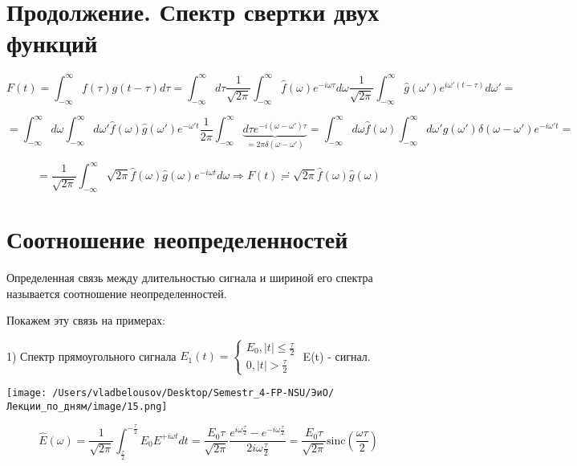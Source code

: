 \documentclass[12pt, a4paper]{report}
\begin{document}
\fi


\section{Продолжение. Спектр свертки двух функций}

\[ F(t)= \int_{-\infty}^{\infty} f(\tau)g(t- \tau)d \tau= \int_{-\infty}^{\infty} d \tau \frac{1}{\sqrt{2 \pi}} \int_{-\infty}^{\infty} \hat{f} (\omega) e ^{- i \omega \tau} d \omega \frac{1}{\sqrt{2\pi}} \int_{-\infty}^{\infty} \hat{g} (\omega') e^{i \omega' (t - \tau)} d \omega'     =\] 

\[ =\int_{-\infty}^{\infty}  d \omega \int_{-\infty}^{\infty} d \omega ' \hat{f} (\omega) \hat{g}(\omega ') e^{- \omega ' t } \frac{1}{2 \pi } \int_{-\infty}^{\infty} \underbrace{d \tau e^{- i (\omega - \omega ' )\tau}}_{=2\pi \delta(\omega- \omega')} = \int_{-\infty}^{\infty}  d \omega \hat{f} ( \omega) \int_{-\infty}^{\infty}  d \omega ' \hat{g} ( \omega ' ) \delta(\omega - \omega ') e ^{-i \omega' t} =        \] 

\[ = \frac{1}{\sqrt{2 \pi}} \int_{-\infty}^{\infty}  \sqrt{ 2 \pi} \hat{f}( \omega ) \hat{g} (\omega   )e ^{- i\omega t}   d \omega \Rightarrow F(t) \risingdotseq \sqrt{ 2 \pi } \hat{f}( \omega ) \hat{g } ( \omega)  \] 

\section{Соотношение неопределенностей}

\begin{definition}
    Определенная связь между длительностью сигнала и шириной его спектра называется соотношение неопределенностей.
\end{definition}

Покажем эту связь на примерах: 

1) Спектр прямоугольного сигнала \( E_1 (t) =\begin{cases}
E_0 , |t| \le  \frac{\tau}{2} \\
0 , |t| > \frac{\tau}{2}
\end{cases} \) E(t) - сигнал.

\begin{center}
    \texttt{[image: /Users/vladbelousov/Desktop/Semestr\_4-FP-NSU/ЭиО/Лекции\_по\_дням/image/15.png]}
\end{center}

\[ \hat{E}(\omega)= \frac{1}{\sqrt{2 \pi}} \int_{\frac{\tau}{2} }^{-\frac{\tau}{2} } E_0 E^{+ i \omega t} d t = \frac{E_0 \tau}{\sqrt{2 \pi}} \frac{e^{ i \omega \frac{\tau}{2} }- e^{ - i \omega \frac{\tau}{2} }}  {2 i \omega \frac{\tau}{2} }     = \frac{E_0 \tau}{\sqrt{2 \pi}} \mathrm{sinc} ( \frac{\omega \tau}{2} )   \] 
\end{document}

